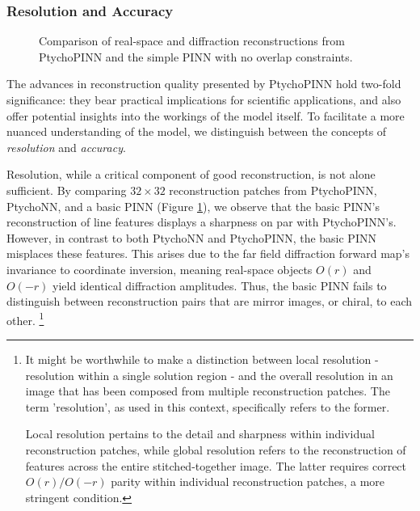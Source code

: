 \documentclass[sn-mathphys]{sn-jnl}%
\theoremstyle{thmstyleone}%
\theoremstyle{thmstyletwo}%
\theoremstyle{thmstylethree}%
\begin{document}
\subsubsection{Resolution and Accuracy}

\begin{figure}
    \centering
    \caption{Comparison of real-space and diffraction reconstructions from PtychoPINN and the simple PINN with no overlap constraints.}%
    \label{fig:patches}
\end{figure}

The advances in reconstruction quality presented by PtychoPINN hold two-fold significance: they bear practical implications for scientific applications, and also offer potential insights into the workings of the model itself. To facilitate a more nuanced understanding of the model, we distinguish between the concepts of \emph{resolution} and \emph{accuracy}.

Resolution, while a critical component of good reconstruction, is not alone sufficient. By comparing $32 \times 32$ reconstruction patches from PtychoPINN, PtychoNN, and a basic PINN (Figure \ref{fig:patches}), we observe that the basic PINN's reconstruction of line features displays a sharpness on par with PtychoPINN's. However, in contrast to both PtychoNN and PtychoPINN, the basic PINN misplaces these features. This arises due to the far field diffraction forward map's invariance to coordinate inversion, meaning real-space objects $O(r)$ and $O(-r)$ yield identical diffraction amplitudes. Thus, the basic PINN fails to distinguish between reconstruction pairs that are mirror images, or chiral, to each other.
\footnote{It might be worthwhile to make a distinction between local resolution - resolution within a single solution region - and the overall resolution in an image that has been composed from multiple reconstruction patches. The term 'resolution', as used in this context, specifically refers to the former.

Local resolution pertains to the detail and sharpness within individual reconstruction patches, while global resolution refers to the reconstruction of features across the entire stitched-together image. The latter requires correct $O(r) / O(-r)$ parity within individual reconstruction patches, a more stringent condition.}
\end{document}
